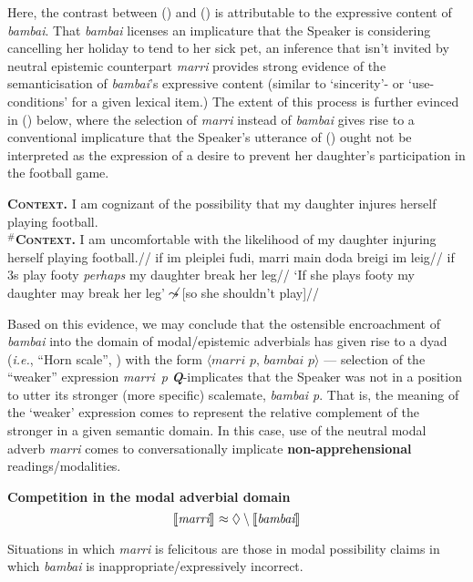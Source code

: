 \noindent Here, the contrast between () and () is attributable to the expressive content of \textit{bambai}. That \textit{bambai} licenses an implicature that the Speaker is considering cancelling her holiday to tend to her sick pet, an inference that isn't invited by neutral epistemic counterpart \textit{marri} provides strong evidence of the semanticisation of \textit{bambai}'s expressive content (similar to `sincerity'- or `use-conditions' for a given lexical item.) The extent of this process is further evinced in (\nextx) below, where the selection of \textit{marri} instead of \textit{bambai} gives rise to a conventional implicature that the Speaker's utterance of (\nextx) ought not be interpreted as the expression of a desire to prevent her daughter's participation in the football game.

\pex\begingl
\glpreamble\textbf{\textsc{Context}.} I am cognizant of the possibility that my daughter injures herself playing football.\\\textbf{$^\#$\textsc{Context.}} I am uncomfortable with the likelihood of my daughter injuring herself playing football.//
\gla if im pleiplei fudi, marri main doda breigi im leig//
\glb  if 3s play footy \textsl{perhaps} my daughter break her leg//
\glft `If she plays footy my daughter may break her leg'\hfill$\not\leadsto$\hfill[so she shouldn't play]\trailingcitation{[AJ 04082017]}//
\endgl\xe

Based on this evidence, we may conclude that the ostensible encroachment of \textit{bambai} into the domain of modal/epistemic adverbials has given rise to a dyad (\textit{i.e.}, ``Horn scale'', \citealp{Horn1984}) with the form $\langle\textit{marri~p, bambai~p}\rangle$ --- selection of the ``weaker'' expression \textit{marri~p} \textbf{\textit{Q}}-implicates that the Speaker was not in a position to utter its stronger (more specific) scalemate, \textit{bambai p}. That is, the meaning of the `weaker' expression comes to represent the relative complement of the stronger in a given semantic domain. In this case, use of the neutral modal adverb \textit{marri} comes to conversationally implicate \textbf{non-apprehensional} readings/modalities.


\pex \textbf{Competition in the modal adverbial domain} $$\llbracket{\textit{marri}}\rrbracket^{}\approx\lozenge\setminus\llbracket{\textit{bambai}}\rrbracket^{}$$

Situations in which \textit{marri} is felicitous are those in modal possibility claims in which \textit{bambai} is inappropriate/expressively incorrect.

